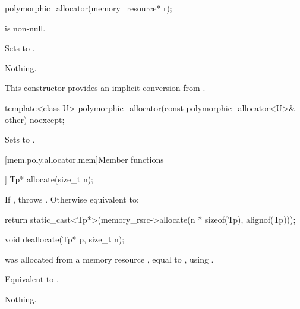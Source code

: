 %
\begin{itemdecl}
polymorphic_allocator(memory_resource* r);
\end{itemdecl}

\begin{itemdescr}
\pnum
\expects
{} is non-null.

\pnum
\effects
Sets  to .

\pnum
\throws
Nothing.

\pnum
\begin{note}
This constructor provides an implicit conversion from .
\end{note}
\end{itemdescr}

%
\begin{itemdecl}
template<class U> polymorphic_allocator(const polymorphic_allocator<U>& other) noexcept;
\end{itemdecl}

\begin{itemdescr}
\pnum
\effects
Sets  to .
\end{itemdescr}


[mem.poly.allocator.mem]{Member functions}

%
\begin{itemdecl}
[[nodiscard]] Tp* allocate(size_t n);
\end{itemdecl}

\begin{itemdescr}
\pnum
\effects
If ,
throws .
Otherwise equivalent to:
\begin{codeblock}
return static_cast<Tp*>(memory_rsrc->allocate(n * sizeof(Tp), alignof(Tp)));
\end{codeblock}
\end{itemdescr}

%
\begin{itemdecl}
void deallocate(Tp* p, size_t n);
\end{itemdecl}

\begin{itemdescr}
\pnum
\expects
{} was allocated from a memory resource ,
equal to ,
using .

\pnum
\effects
Equivalent to .

\pnum
\throws
Nothing.
\end{itemdescr}

